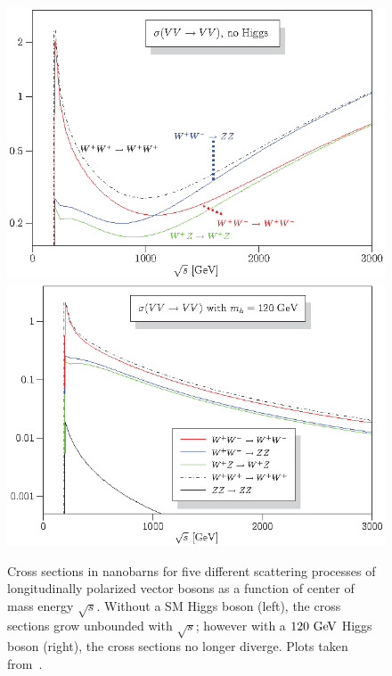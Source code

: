 \begin{figure}[htbp]
  \centering
  \includegraphics[height=.25\textheight]{figs/ssww_13tev/introduction/vbs_xsec_nohiggs}
  \includegraphics[height=.25\textheight]{figs/ssww_13tev/introduction/vbs_xsec_higgs120}
 
  \caption[Cross sections in nanobarns for five different scattering processes of longitudinally polarized vector bosons as a function of center of mass energy $\sqrt{s}$.  Without a SM Higgs boson (left), the cross sections grow unbounded with $\sqrt{s}$; however with a $120\gev$ Higgs boson (right), the cross sections no longer diverge.]{Cross sections in nanobarns for five different scattering processes of longitudinally polarized vector bosons as a function of center of mass energy $\sqrt{s}$.  Without a SM Higgs boson (left), the cross sections grow unbounded with $\sqrt{s}$; however with a $120\gev$ Higgs boson (right), the cross sections no longer diverge.  Plots taken from~\cite{2008.vbs-resonances-unitarity}.}
  \label{fig:theory_vbs_xsec_higgs}
\end{figure}
